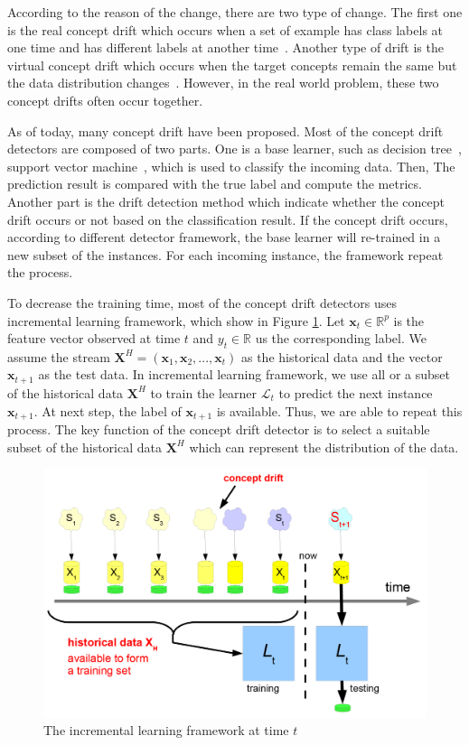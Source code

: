 According to the reason of the change, there are two type of change. The first one is the real concept drift which occurs when a set of example has class labels at one time and has different labels at another time~\cite{kolter2007dynamic}. Another type of drift is the virtual concept drift which occurs when the target concepts remain the same but the data distribution changes~\cite{delany2005case}. However, in the real world problem, these two concept drifts often occur together.

As of today, many concept drift have been proposed. Most of the concept drift detectors are composed of two parts. One is a base learner, such as decision tree~\cite{wang2003mining}, support vector machine~\cite{klinkenberg2000detecting}, which is used to classify the incoming data. Then, The prediction result is compared with the true label and compute the metrics. Another part is the drift detection method which indicate whether the concept drift occurs or not based on the classification result. If the concept drift occurs, according to different detector framework, the base learner will re-trained in a new subset of the instances. For each incoming instance, the framework repeat the process.  

To decrease the training time, most of the concept drift detectors uses incremental learning framework, which show in Figure \ref{concept_drift}. Let $\mathbf{x}_t \in \mathbb{R}^p$ is the feature vector observed at time $t$ and $y_t \in \mathbb{R}$ us the corresponding label. We assume the stream $\mathbf{X}^H = (\mathbf{x}_1, \mathbf{x}_2, ..., \mathbf{x}_t)$ as the historical data and the vector $\mathbf{x}_{t+1}$ as the test data. In incremental learning framework, we use all or a subset of the historical data $\mathbf{X}^H$ to train the learner $\mathcal{L}_t$ to predict the next instance $\mathbf{x}_{t+1}$. At next step, the label of $\mathbf{x}_{t+1}$ is available. Thus, we are able to repeat this process. The key function of the concept drift detector is to select a suitable subset of the historical data $\mathbf{X}^H$ which can represent the distribution of the data.
 \begin{figure}
\centering
\caption{The incremental learning framework at time $t$~\cite{vzliobaite2010learning}}
\label{concept_drift}
\includegraphics{concept_drift.png}

\end{figure}


